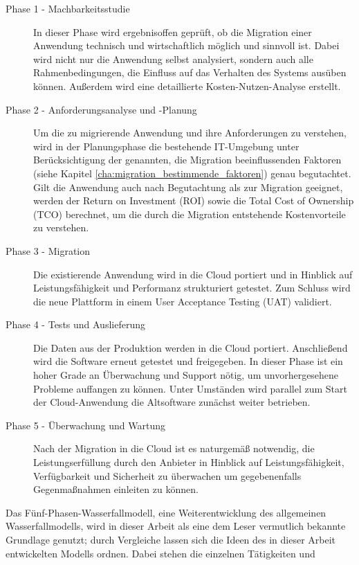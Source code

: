 \begin{description}
	\item[Phase 1 - Machbarkeitsstudie] In dieser Phase wird ergebnisoffen
geprüft, ob die Migration einer Anwendung technisch und wirtschaftlich möglich
und sinnvoll ist. Dabei wird nicht nur die Anwendung selbst analysiert, sondern
auch alle Rahmenbedingungen, die Einfluss auf das Verhalten des Systems ausüben
können. Außerdem wird eine detaillierte Kosten-Nutzen-Analyse erstellt.

	\item[Phase 2 - Anforderungsanalyse und -Planung] Um die zu migrierende
Anwendung und ihre Anforderungen zu verstehen, wird in der Planungsphase die
bestehende IT-Umgebung unter Berücksichtigung der genannten, die Migration
beeinflussenden Faktoren (siehe  Kapitel
\ref{cha:migration_bestimmende_faktoren})
genau begutachtet. Gilt die Anwendung auch nach Begutachtung als zur Migration
geeignet, werden der Return on Investment (ROI) sowie die Total Cost of
Ownership (TCO) berechnet, um die durch die Migration entstehende
Kostenvorteile
zu verstehen.

	\item[Phase 3 - Migration] Die existierende Anwendung wird in die Cloud
portiert und in Hinblick auf Leistungsfähigkeit und Performanz strukturiert
getestet. Zum Schluss wird die neue Plattform in einem User Acceptance Testing
(UAT) validiert.

	\item[Phase 4 - Tests und Auslieferung] Die Daten aus der Produktion
werden in die Cloud portiert. Anschließend wird die Software erneut getestet
und freigegeben. In dieser Phase ist ein hoher Grade an Überwachung und Support
nötig, um unvorhergesehene Probleme auffangen zu können. Unter Umständen wird
parallel zum Start der Cloud-Anwendung die Altsoftware zunächst weiter
betrieben.

	\item[Phase 5 - Überwachung und Wartung] Nach der Migration in die
Cloud ist es naturgemäß notwendig, die Leistungserfüllung durch den Anbieter in
Hinblick auf Leistungsfähigkeit, Verfügbarkeit und Sicherheit zu überwachen um
gegebenenfalls Gegenmaßnahmen einleiten zu können.
\end{description}
Das Fünf-Phasen-Wasserfallmodell, eine Weiterentwicklung des allgemeinen 
Wasserfallmodells, wird in dieser Arbeit als eine dem Leser vermutlich bekannte 
Grundlage genutzt; durch Vergleiche lassen sich die Ideen des in dieser Arbeit 
entwickelten Modells ordnen. Dabei stehen die einzelnen Tätigkeiten und 
